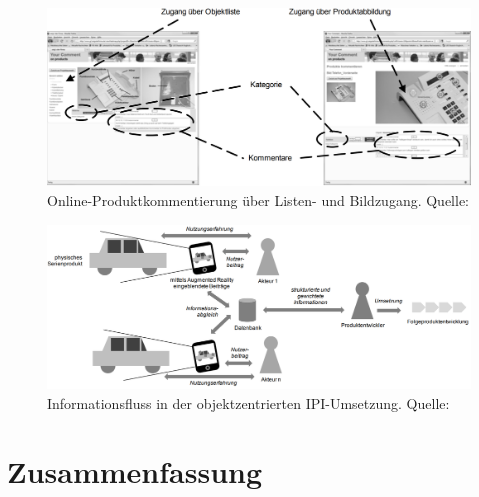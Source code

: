 \begin{figure}[H]
	\centering
	\includegraphics[width=1.0\textwidth]{resources/analyse/IPI_Vergleich_Listen_BildAnnotationeAnsicht.png}
	\caption{Online-Produktkommentierung über Listen- und Bildzugang. Quelle: \cite[S.~7]{Kirschner2011}}
	\label{img:ipi_list_image}
\end{figure}

\begin{figure}[H]
	\centering
	\includegraphics[width=1.0\textwidth]{resources/analyse/IPI_Objektzentriert.png}
	\caption{Informationsfluss  in der objektzentrierten IPI-Umsetzung. Quelle:\cite[S.~135]{Kirschner2012}}
	\label{img:objekt_centered_ipi}
\end{figure}





\section{Zusammenfassung}